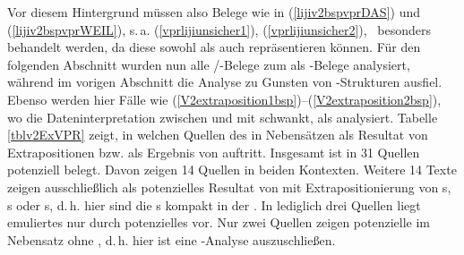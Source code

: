 Vor diesem Hintergrund müssen also Belege wie in (\ref{lijiv2bspvprDAS}) und (\ref{lijiv2bspvprWEIL}), s.\,a. (\ref{vprlijiunsicher1}), (\ref{vprlijiunsicher2}), \,%
besonders behandelt werden, da diese sowohl \hai{{\VPR}} als auch  repräsentieren können. Für den folgenden Abschnitt wurden nun alle /\hai{{\VPR}}-Belege zum \hai{{\LiJi}} als -Belege analysiert, während im vorigen Abschnitt die Analyse zu Gunsten von \hai{{\VPR}}-Strukturen ausfiel. Ebenso werden hier Fälle wie (\ref{V2extraposition1bsp})–(\ref{V2extraposition2bsp}), wo die Dateninterpretation zwischen  und  mit \hai{{\VR}} schwankt, als  analysiert. %
Tabelle \ref{tblv2ExVPR} zeigt, in welchen Quellen des   in Nebensätzen als Resultat von Extrapositionen bzw. als Ergebnis von \hai{{\VPR}} auftritt. Insgesamt ist  in 31 Quellen potenziell belegt. Davon zeigen 14 Quellen  in beiden Kontexten. Weitere 14 Texte zeigen  ausschließlich als potenzielles Resultat von \hai{{\VR}} mit Extrapositionierung von \hai{{\NP}}s, \hai{{\PP}}s oder \hai{{\AP}}s, d.\,h. hier sind die s kompakt in der \hai{{\LSK}}. 
In lediglich drei Quellen liegt emuliertes  nur durch potenzielles \hai{{\VPR}} vor. Nur zwei Quellen zeigen potenzielle  im Nebensatz ohne \hai{{\VR}}, d.\,h. hier ist eine -Analyse auszuschließen.%

